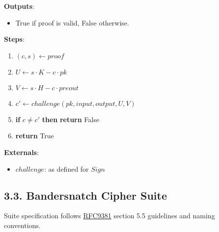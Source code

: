 \documentclass[
]{article}
\providecommand{\tightlist}{%
  \setlength{\itemsep}{0pt}\setlength{\parskip}{0pt}}
\begin{document}
\textbf{Outputs}:

\begin{itemize}
\tightlist
\item
  True if proof is valid, False otherwise.
\end{itemize}

\textbf{Steps}:

\begin{enumerate}
\def\labelenumi{\arabic{enumi}.}
\tightlist
\item
  \((c, s) \leftarrow proof\)
\item
  \(U \leftarrow s \cdot K - c \cdot pk\)
\item
  \(V \leftarrow s \cdot H - c \cdot preout\)
\item
  \(c' \leftarrow challenge(pk, input, output, U, V)\)
\item
  \textbf{if} \(c \neq c'\) \textbf{then} \textbf{return} False
\item
  \textbf{return} True
\end{enumerate}

\textbf{Externals}:

\begin{itemize}
\tightlist
\item
  \(challenge\): as defined for \(Sign\)
\end{itemize}

\hypertarget{bandersnatch-cipher-suite}{%
\subsection{3.3. Bandersnatch Cipher
Suite}\label{bandersnatch-cipher-suite}}

Suite specification follows
\href{https://datatracker.ietf.org/doc/rfc9381/}{RFC9381} section 5.5
guidelines and naming conventions.
\end{document}
